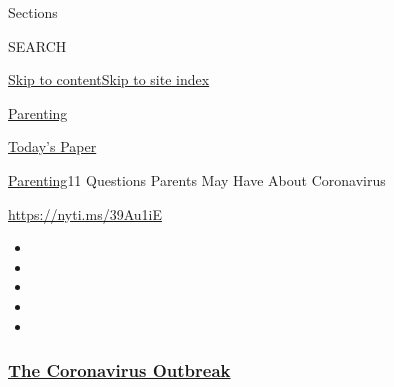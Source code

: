 Sections

SEARCH

\protect\hyperlink{site-content}{Skip to
content}\protect\hyperlink{site-index}{Skip to site index}

\href{https://www.nytimes3xbfgragh.onion/section/parenting}{Parenting}

\href{https://myaccount.nytimes3xbfgragh.onion/auth/login?response_type=cookie\&client_id=vi}{}

\href{https://www.nytimes3xbfgragh.onion/section/todayspaper}{Today's
Paper}

\href{/section/parenting}{Parenting}\textbar{}11 Questions Parents May
Have About Coronavirus

\url{https://nyti.ms/39Au1iE}

\begin{itemize}
\item
\item
\item
\item
\item
\end{itemize}

\hypertarget{the-coronavirus-outbreak}{%
\subsubsection{\texorpdfstring{\href{https://www.nytimes3xbfgragh.onion/news-event/coronavirus?name=styln-coronavirus-national\&region=TOP_BANNER\&block=storyline_menu_recirc\&action=click\&pgtype=Article\&impression_id=50c75390-efb9-11ea-9f2d-2b6e424d6802\&variant=undefined}{The
Coronavirus
Outbreak}}{The Coronavirus Outbreak}}\label{the-coronavirus-outbreak}}

